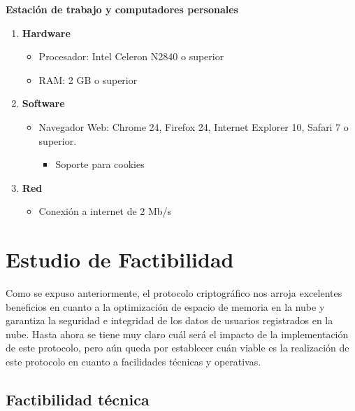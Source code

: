\textbf{Estación de trabajo y computadores personales}
\begin{enumerate}
\item \textbf{Hardware}
\begin{itemize}
\item Procesador: Intel Celeron N2840 o superior
\item RAM: 2 GB o superior
\end{itemize}
\item \textbf{Software}
\begin{itemize}
\item Navegador Web: Chrome 24, Firefox 24, Internet Explorer 10, Safari 7 o superior.
\begin{itemize}
\item Soporte para cookies
\end{itemize}
\end{itemize}

\item \textbf{Red}
\begin{itemize}
\item Conexión a internet de 2 Mb/s
\end{itemize}

\end{enumerate}

\section{Estudio de Factibilidad}

Como se expuso anteriormente, el protocolo criptográfico nos arroja excelentes beneficios en cuanto a la optimización de espacio de memoria en la nube y garantiza la seguridad e integridad de los datos de usuarios registrados en la nube. Hasta ahora se tiene muy claro cuál será el impacto de la implementación de este protocolo, pero aún queda por establecer cuán viable es la realización de este protocolo en cuanto a facilidades técnicas y operativas.

\subsection{Factibilidad técnica}

